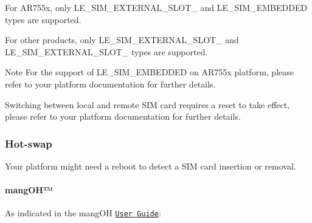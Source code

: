 For A\+R755x, only L\+E\+\_\+\+S\+I\+M\+\_\+\+E\+X\+T\+E\+R\+N\+A\+L\+\_\+\+S\+L\+O\+T\+\_ and L\+E\+\_\+\+S\+I\+M\+\_\+\+E\+M\+B\+E\+D\+D\+ED types are supported.

For other products, only L\+E\+\_\+\+S\+I\+M\+\_\+\+E\+X\+T\+E\+R\+N\+A\+L\+\_\+\+S\+L\+O\+T\+\_ and L\+E\+\_\+\+S\+I\+M\+\_\+\+E\+X\+T\+E\+R\+N\+A\+L\+\_\+\+S\+L\+O\+T\+\_ types are supported.

\begin{DoxyNote}{Note}
For the support of L\+E\+\_\+\+S\+I\+M\+\_\+\+E\+M\+B\+E\+D\+D\+ED on A\+R755x platform, please refer to your platform documentation for further details.

Switching between local and remote S\+IM card requires a reset to take effect, please refer to your platform documentation for further details.
\end{DoxyNote}
\hypertarget{platformConstraintsSim_platformConstraintsSim_swap}{}\subsubsection{Hot-\/swap}\label{platformConstraintsSim_platformConstraintsSim_swap}
Your platform might need a reboot to detect a S\+IM card insertion or removal.\hypertarget{platformConstraintsSim_platformConstraintsSim_swapMangOH}{}\paragraph{mang\+O\+H™}\label{platformConstraintsSim_platformConstraintsSim_swapMangOH}
As indicated in the mang\+OH\texttrademark{} \href{http://mangoh.io/mangoh-green-resources-documentation}{\tt User Guide}\+:

